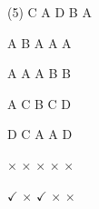 \documentclass[10.5pt, a4paper]{article}
\begin{document}
        \begin{tasks}[label=\arabic*.](5)
            \task C
            \task A
            \task D
            \task B
            \task A

            \task A
            \task B
            \task A
            \task A
            \task A

            \task A
            \task A
            \task A
            \task B
            \task B

            \task A
            \task C
            \task B
            \task C
            \task D

            \task D
            \task C
            \task A
            \task A
            \task D

            \task $\times$
            \task $\times$
            \task $\times$
            \task $\times$
            \task $\times$

            \task $\checkmark$
            \task $\times$
            \task $\checkmark$
            \task $\times$
            \task $\times$
        \end{tasks}
\end{document}
